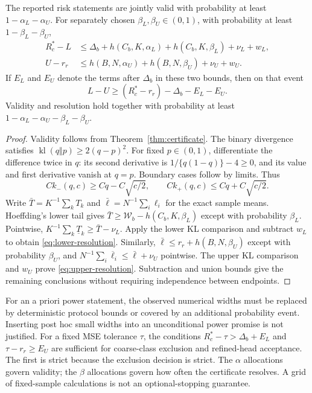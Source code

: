 \begin{theorem}
\label{thm:resolution}
The reported risk statements are jointly valid with probability at least
$1-\alpha_L-\alpha_U$. For separately chosen
$\beta_L,\beta_U\in(0,1)$, with probability at least
$1-\beta_L-\beta_U$,
\begin{align}
 R_c^*-L
 &\leq\Delta_b+h(C_b,K,\alpha_L)+h(C_b,K,\beta_L)+\nu_L+w_L,
       \label{eq:lower-resolution}\\
 U-r_r
 &\leq h(B,N,\alpha_U)+h(B,N,\beta_U)+\nu_U+w_U.
       \label{eq:upper-resolution}
\end{align}
If $E_L$ and $E_U$ denote the terms after $\Delta_b$ in these two
bounds, then on that event
\begin{equation}
 L-U\geq (R_c^*-r_r)-\Delta_b-E_L-E_U.
 \label{eq:gain-resolution}
\end{equation}
Validity and resolution hold together with probability at least
$1-\alpha_L-\alpha_U-\beta_L-\beta_U$.
\end{theorem}

\begin{proof}
Validity follows from Theorem~\ref{thm:certificate}. The binary
divergence satisfies $\operatorname{kl}(q\Vert p)\geq2(q-p)^2$.
For fixed $p\in(0,1)$, differentiate the difference twice in $q$:
its second derivative is $1/\{q(1-q)\}-4\geq0$, and its value and
first derivative vanish at $q=p$. Boundary cases follow by limits.
Thus
\[
 C k_-(q,c)\geq Cq-C\sqrt{c/2},\qquad
 C k_+(q,c)\leq Cq+C\sqrt{c/2}.
\]
Write $\bar T=K^{-1}\sum_k T_k$ and
$\bar\ell=N^{-1}\sum_i\ell_i$ for the exact sample means.
Hoeffding's lower tail gives
$\bar T\geq\mathcal W_b-h(C_b,K,\beta_L)$ except with
probability $\beta_L$. Pointwise,
$K^{-1}\sum_k\underline T_k\geq\bar T-\nu_L$.
Apply the lower KL comparison and subtract $w_L$ to obtain
\eqref{eq:lower-resolution}.
Similarly, $\bar\ell\leq r_r+h(B,N,\beta_U)$ except with
probability $\beta_U$, and
$N^{-1}\sum_i\overline\ell_i\leq\bar\ell+\nu_U$ pointwise.
The upper KL comparison and $w_U$ prove
\eqref{eq:upper-resolution}. Subtraction and union bounds give the
remaining conclusions without requiring independence between endpoints.
\end{proof}

For an a priori power statement, the observed numerical widths must be
replaced by deterministic protocol bounds or covered by an additional
probability event. Inserting post hoc small widths into an unconditional
power promise is not justified. For a fixed MSE tolerance $\tau$, the
conditions $R_c^*-\tau>\Delta_b+E_L$ and $\tau-r_r\geq E_U$ are
sufficient for coarse-class exclusion and refined-head acceptance. The
first is strict because the exclusion decision is strict. The $\alpha$
allocations govern validity; the $\beta$ allocations govern how often
the certificate resolves. A grid of fixed-sample calculations is not an
optional-stopping guarantee.

